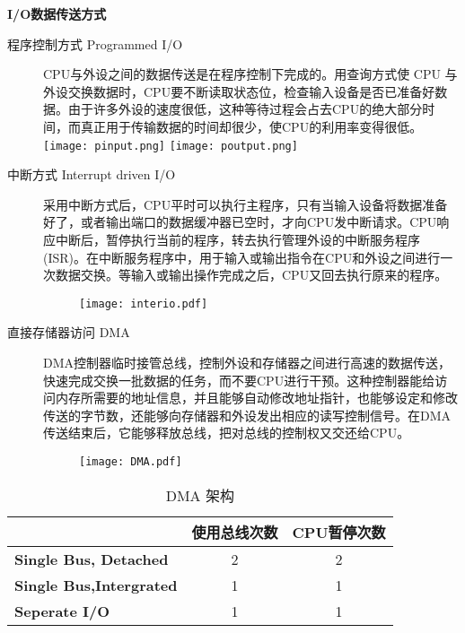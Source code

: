 \textbf{I/O数据传送方式}
\begin{description}
	\item[程序控制方式 Programmed I/O] CPU与外设之间的数据传送是在程序控制下完成的。用查询方式使 CPU 与外设交换数据时，CPU要不断读取状态位，检查输入设备是否已准备好数据。由于许多外设的速度很低，这种等待过程会占去CPU的绝大部分时间，而真正用于传输数据的时间却很少，使CPU的利用率变得很低。
	\texttt{[image: pinput.png]}
	\texttt{[image: poutput.png]}
	\item[中断方式 Interrupt driven I/O]采用中断方式后，CPU平时可以执行主程序，只有当输入设备将数据准备好了，或者输出端口的数据缓冲器已空时，才向CPU发中断请求。CPU响应中断后，暂停执行当前的程序，转去执行管理外设的中断服务程序(ISR)。在中断服务程序中，用于输入或输出指令在CPU和外设之间进行一次数据交换。等输入或输出操作完成之后，CPU又回去执行原来的程序。
	\begin{figure}[H]
	\texttt{[image: interio.pdf]}
	\end{figure}
	\item[直接存储器访问 DMA] DMA控制器临时接管总线，控制外设和存储器之间进行高速的数据传送，快速完成交换一批数据的任务，而不要CPU进行干预。这种控制器能给访问内存所需要的地址信息，并且能够自动修改地址指针，也能够设定和修改传送的字节数，还能够向存储器和外设发出相应的读写控制信号。在DMA传送结束后，它能够释放总线，把对总线的控制权又交还给CPU。
	\begin{figure}[H]
	\texttt{[image: DMA.pdf]}
	\end{figure}
\end{description}

\begin{table*}
	\centering
	\caption{DMA 架构}
	\begin{tabular}{|>{\bfseries}l|c|c|}
		\hline
		& \bfseries 使用总线次数 &\bfseries CPU暂停次数 \\
		\hline
		Single Bus, Detached & 2 & 2 \\
		Single Bus,Intergrated & 1 & 1 \\
		Seperate I/O & 1 & 1 \\
		\hline
	\end{tabular}
\end{table*}
